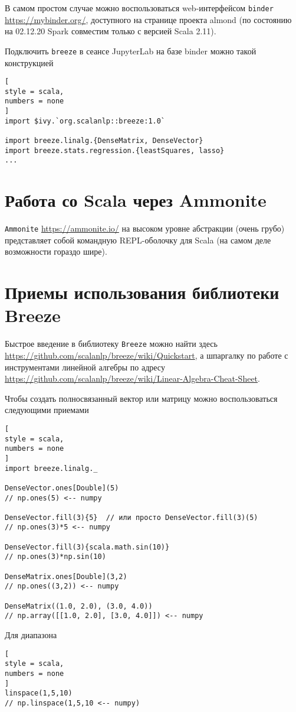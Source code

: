 \documentclass[%
	11pt,
	a4paper,
	utf8,
		]{article}
\begin{document}
В самом простом случае можно воспользоваться web-интерфейсом \texttt{binder} \url{https://mybinder.org/}, доступного на странице проекта almond (по состоянию на 02.12.20 Spark совместим только с версией Scala 2.11).

Подключить \texttt{breeze} в сеансе JupyterLab на базе binder можно такой конструкцией
\begin{lstlisting}[
style = scala,
numbers = none	
]
import $ivy.`org.scalanlp::breeze:1.0`

import breeze.linalg.{DenseMatrix, DenseVector}
import breeze.stats.regression.{leastSquares, lasso}
...
\end{lstlisting}

\section{Работа со Scala через Ammonite}

\texttt{Ammonite} \url{https://ammonite.io/} на высоком уровне абстракции (очень грубо) представляет собой командную REPL-оболочку для Scala (на самом деле возможности гораздо шире).


\section{Приемы использования библиотеки Breeze}

Быстрое введение в библиотеку \texttt{Breeze} можно найти здесь \url{https://github.com/scalanlp/breeze/wiki/Quickstart}, а шпаргалку по работе с инструментами линейной алгебры по адресу \url{https://github.com/scalanlp/breeze/wiki/Linear-Algebra-Cheat-Sheet}.

Чтобы создать полносвязанный вектор или матрицу можно воспользоваться следующими приемами
\begin{lstlisting}[
style = scala,
numbers = none	
]
import breeze.linalg._

DenseVector.ones[Double](5) 
// np.ones(5) <-- numpy

DenseVector.fill(3){5}  // или просто DenseVector.fill(3)(5)
// np.ones(3)*5 <-- numpy

DenseVector.fill(3){scala.math.sin(10)}
// np.ones(3)*np.sin(10)

DenseMatrix.ones[Double](3,2)
// np.ones((3,2)) <-- numpy

DenseMatrix((1.0, 2.0), (3.0, 4.0))
// np.array([[1.0, 2.0], [3.0, 4.0]]) <-- numpy
\end{lstlisting}

Для диапазона
\begin{lstlisting}[
style = scala,
numbers = none	
]
linspace(1,5,10)
// np.linspace(1,5,10 <-- numpy)
\end{lstlisting}
\end{document}
